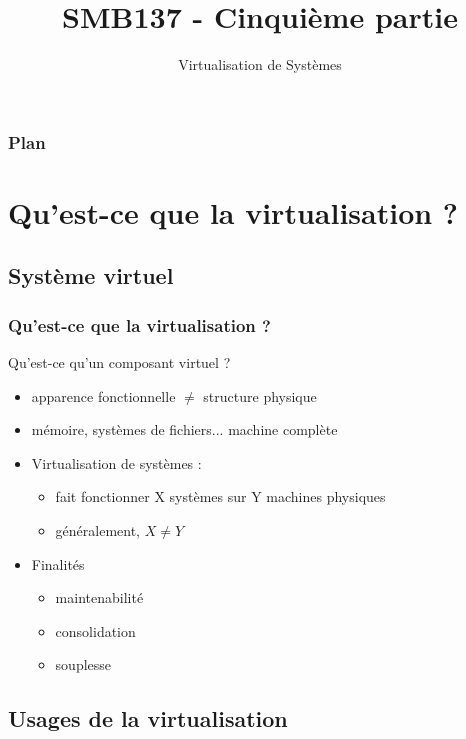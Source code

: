 

\title{SMB137 - Cinquième partie}
\subtitle{Virtualisation de Systèmes}


\frame[plain]{\titlepage}


\begin{frame}
 \frametitle{Plan}
 \tableofcontents
\end{frame} 

\section{Qu'est-ce que la virtualisation ?}

\subsection{Système virtuel}

\begin{frame}
\frametitle{Qu'est-ce que la virtualisation ?}
\begin{block}{Qu'est-ce qu'un composant virtuel ?}
\begin{itemize}
\item apparence fonctionnelle $\ne$ structure physique
\item mémoire, systèmes de fichiers... machine complète
\end{itemize}
\end{block}
\begin{itemize}
\item <2>Virtualisation de systèmes :
\begin{itemize}
\item fait fonctionner X systèmes sur Y machines physiques
\item généralement, $X \ne Y$
\end{itemize}
\item <3>Finalités
\begin{itemize}
\item maintenabilité
\item consolidation
\item souplesse
\end{itemize}
\end{itemize}
\end{frame}

\subsection{Usages de la virtualisation}

